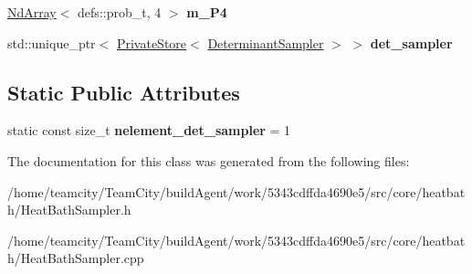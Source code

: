 \begin{DoxyCompactItemize}
\item 
\hyperlink{classNdArray}{Nd\+Array}$<$ defs\+::prob\+\_\+t, 4 $>$ {\bfseries m\+\_\+\+P4}\hypertarget{classHeatBathSampler_a0cab2d919f0926823d6c3c77ee254d82}{}\label{classHeatBathSampler_a0cab2d919f0926823d6c3c77ee254d82}

\item 
std\+::unique\+\_\+ptr$<$ \hyperlink{classPrivateStore}{Private\+Store}$<$ \hyperlink{classDeterminantSampler}{Determinant\+Sampler} $>$ $>$ {\bfseries det\+\_\+sampler}\hypertarget{classHeatBathSampler_a2dbaa680562054cca20fa8419c4f6228}{}\label{classHeatBathSampler_a2dbaa680562054cca20fa8419c4f6228}

\end{DoxyCompactItemize}
\subsection*{Static Public Attributes}
\begin{DoxyCompactItemize}
\item 
static const size\+\_\+t {\bfseries nelement\+\_\+det\+\_\+sampler} = 1\hypertarget{classHeatBathSampler_a9a1765224abde57098fccffb48136860}{}\label{classHeatBathSampler_a9a1765224abde57098fccffb48136860}

\end{DoxyCompactItemize}


The documentation for this class was generated from the following files\+:\begin{DoxyCompactItemize}
\item 
/home/teamcity/\+Team\+City/build\+Agent/work/5343cdffda4690e5/src/core/heatbath/Heat\+Bath\+Sampler.\+h\item 
/home/teamcity/\+Team\+City/build\+Agent/work/5343cdffda4690e5/src/core/heatbath/Heat\+Bath\+Sampler.\+cpp\end{DoxyCompactItemize}
